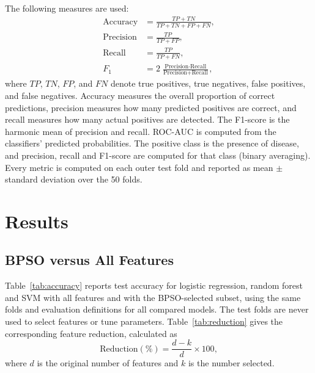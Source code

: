 \documentclass[conference]{IEEEtran}
\begin{document}
The following measures are used:
\begin{align}
\text{Accuracy} &= \frac{TP + TN}{TP + TN + FP + FN},\\
\text{Precision} &= \frac{TP}{TP + FP},\\
\text{Recall} &= \frac{TP}{TP + FN},\\
F_1 &= 2\,\frac{\text{Precision}\cdot\text{Recall}}{\text{Precision} + \text{Recall}},
\end{align}
where $TP$, $TN$, $FP$, and $FN$ denote true positives, true negatives, false
positives, and false negatives. Accuracy measures the overall proportion of
correct predictions, precision measures how many predicted positives are
correct, and recall measures how many actual positives are detected. The
F1-score is the harmonic mean of precision and recall. ROC-AUC is computed
from the classifiers' predicted probabilities. The positive class is the
presence of disease, and precision, recall and F1-score are computed for that
class (binary averaging). Every metric is computed on each outer test fold and
reported as mean $\pm$ standard deviation over the 50 folds.

\section{Results}

\subsection{BPSO versus All Features}

Table~\ref{tab:accuracy} reports test accuracy for logistic regression,
random forest and SVM with all features and with the BPSO-selected subset,
using the same folds and evaluation definitions for all compared models. The
test folds are never used to select features or tune parameters.
Table~\ref{tab:reduction} gives the corresponding feature reduction,
calculated as
\begin{equation}
\text{Reduction}(\%) = \frac{d - k}{d} \times 100,
\end{equation}
where $d$ is the original number of features and $k$ is the number selected.
\end{document}
